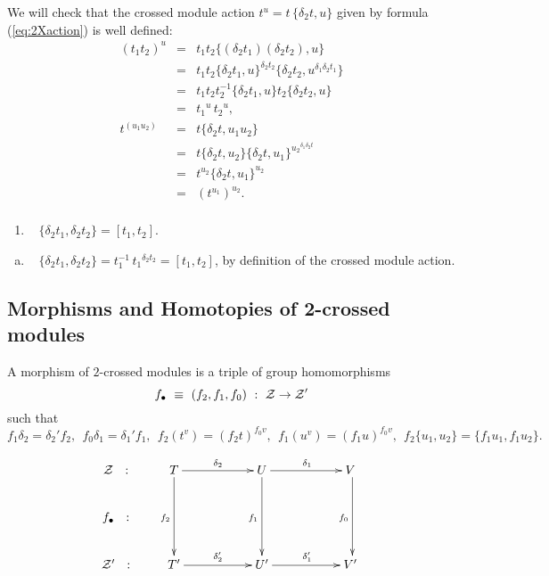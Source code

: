 \medskip\noindent
We will check that the crossed module action  $t^u = t\,\{\delta_2t,u\}$ 
given by formula (\ref{eq:2Xaction}) is well defined:
\begin{eqnarray*}
(t_1t_2)^{u} 
  & = &  t_1 t_2 \{(\delta_2 t_1)(\delta_2 t_2), u \} \\
  & = &  t_1 t_2 \{\delta_2 t_1, u \}^{\delta_2 t_2} 
                 \{\delta_2 t_2, u^{\delta_1 \delta_2 t_1} \} \\
  & = &  t_1 t_2 t_2^{-1} \{\delta_2 t_1, u \}
                 t_2 \{\delta_2 t_2, u\} \\
  & = &  {t_1}^u\,{t_2}^u, \\
t^{(u_1u_2)} 
  & = &  t \{\delta_2 t, u_1u_2 \} \\
  & = &  t \{\delta_2 t,u_2\}\{\delta_2 t, u_1\}^{{u_2}^{\delta_1\delta_2 t}}\\
  & = &  t^{u_2} \{\delta_2 t, u_1\}^{u_2} \\
  & = &  (t^{u_1})^{u_2}. \\
\end{eqnarray*}

\begin{lem} \label{lem:Peiffer-props}
\begin{enumerate}[{\rm (a)}]
\item~
$\{\delta_2t_1,\delta_2t_2\} = [t_1,t_2]$.
\end{enumerate}
\end{lem}
\begin{pf}
\begin{enumerate}[(a)]
\item~
$\{\delta_2t_1,\delta_2t_2\} = t_1^{-1}\,{t_1}^{\delta_2t_2} = [t_1,t_2]$,
by definition of the crossed module action.
\end{enumerate}
\end{pf}


\subsection{Morphisms and Homotopies of 2-crossed modules} 
\label{subs:morph-homot}

\begin{defn}  
A morphism of $2$-crossed modules is a triple of group homomorphisms
$$
f_{\bullet} ~\equiv~ (f_2, f_1, f_0) ~:~ \cal Z \to \mathcal{Z}'
$$
such that
$$
f_1\delta_2 = \delta_2'f_2,~~
f_0\delta_1 = \delta_1'f_1,~~
f_2(t^v) = (f_2t)^{f_0v},~~
f_1(u^v) = (f_1u)^{f_0v},~~
f_2\{u_1,u_2\} = \{f_1u_1,f_1u_2\}.
$$
\end{defn}
$$
\xymatrix{
\calZ ~~:
  &  T \ar[rr]^{\delta_2} \ar[dd]_{f_2}
     &&  U \ar[rr]^{\delta_1} \ar[dd]_{f_1}
         && V~ \ar[dd]_{f_0} \\
f_{\bullet} ~~:
  &  &&  &&  \\
\calZ' ~~:
  &  T' \ar[rr]^{\delta_2'} 
     &&  U' \ar[rr]^{\delta_1'}
         && V'~ \\
}
$$

